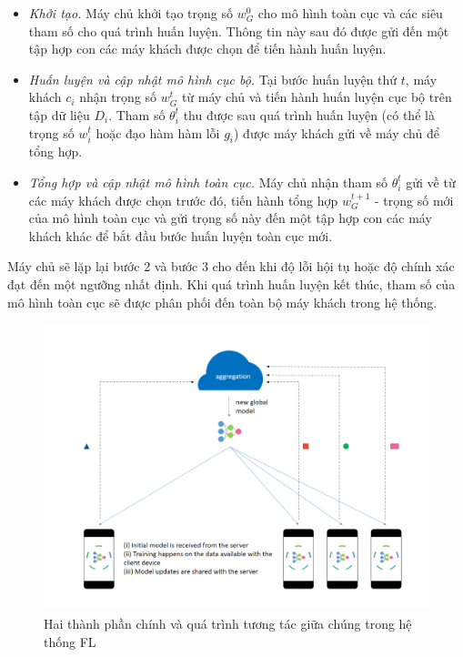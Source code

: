 \begin{itemize}
    \item \textit{Khởi tạo.} Máy chủ khởi tạo trọng số $w_G^0$ cho mô hình toàn cục và các siêu tham số cho quá trình huấn luyện. Thông tin này sau đó được gửi đến một tập hợp con các máy khách được chọn để tiến hành huấn luyện.

    \item \textit{Huấn luyện và cập nhật mô hình cục bộ.} Tại bước huấn luyện thứ $t$, máy khách $c_i$ nhận trọng số $w_G^t$ từ máy chủ và tiến hành huấn luyện cục bộ trên tập dữ liệu $D_i$. Tham số $\theta_i^{t}$ thu được sau quá trình huấn luyện (có thể là trọng số $w_i^{t}$ hoặc đạo hàm hàm lỗi $g_i$) được máy khách gửi về máy chủ để tổng hợp.

    \item \textit{Tổng hợp và cập nhật mô hình toàn cục.} Máy chủ nhận tham số $\theta_i^{t}$ gửi về từ các máy khách được chọn trước đó, tiến hành tổng hợp $w_G^{t+1}$ - trọng số mới của mô hình toàn cục và gửi trọng số này đến một tập hợp con các máy khách khác để bắt đầu bước huấn luyện toàn cục mới.
\end{itemize}

Máy chủ sẽ lặp lại bước 2 và bước 3 cho đến khi độ lỗi hội tụ hoặc độ chính xác đạt đến một ngưỡng nhất định. Khi quá trình huấn luyện kết thúc, tham số của mô hình toàn cục sẽ được phân phối đến toàn bộ máy khách trong hệ thống.

\begin{figure}[H]
    \begin{center}
        \includegraphics[scale=0.85]{images/fl.png}
        \caption{Hai thành phần chính và quá trình tương tác giữa chúng trong hệ thống FL \cite{chandorikar_2020}}
        \label{fig:fl}
    \end{center}
\end{figure}

